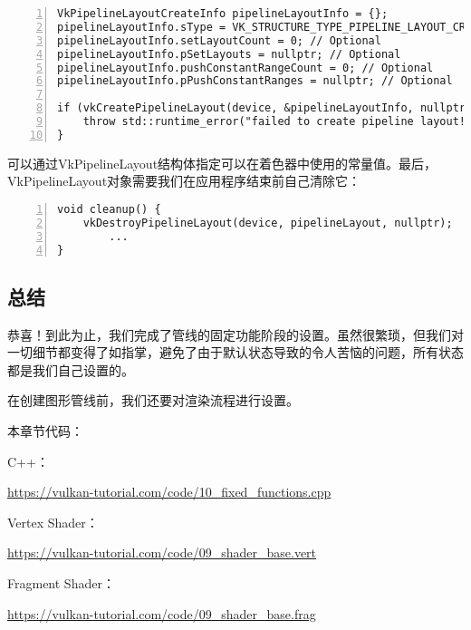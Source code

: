 \documentclass{ctexart}
\begin{document}
\begin{lstlisting}[language={[ANSI]C},keywordstyle=\color{blue!70},commentstyle=\color{red!50!green!50!blue!50},frame=shadowbox, rulesepcolor=\color{red!20!green!20!blue!20},basicstyle=\small,numbers=left, numberstyle=\tiny,breaklines=true]
VkPipelineLayoutCreateInfo pipelineLayoutInfo = {};
pipelineLayoutInfo.sType = VK_STRUCTURE_TYPE_PIPELINE_LAYOUT_CREATE_INFO;
pipelineLayoutInfo.setLayoutCount = 0; // Optional
pipelineLayoutInfo.pSetLayouts = nullptr; // Optional
pipelineLayoutInfo.pushConstantRangeCount = 0; // Optional
pipelineLayoutInfo.pPushConstantRanges = nullptr; // Optional

if (vkCreatePipelineLayout(device, &pipelineLayoutInfo, nullptr, &pipelineLayout) != VK_SUCCESS) {
	throw std::runtime_error("failed to create pipeline layout!");
}
\end{lstlisting}

可以通过VkPipelineLayout结构体指定可以在着色器中使用的常量值。最后，VkPipelineLayout对象需要我们在应用程序结束前自己清除它：

\begin{lstlisting}[language={[ANSI]C},keywordstyle=\color{blue!70},commentstyle=\color{red!50!green!50!blue!50},frame=shadowbox, rulesepcolor=\color{red!20!green!20!blue!20},basicstyle=\small,numbers=left, numberstyle=\tiny,breaklines=true]
void cleanup() {
	vkDestroyPipelineLayout(device, pipelineLayout, nullptr);
		...
}
\end{lstlisting}

\subsection{总结}

恭喜！到此为止，我们完成了管线的固定功能阶段的设置。虽然很繁琐，但我们对一切细节都变得了如指掌，避免了由于默认状态导致的令人苦恼的问题，所有状态都是我们自己设置的。

在创建图形管线前，我们还要对渲染流程进行设置。

本章节代码：

C++：

\url{https://vulkan-tutorial.com/code/10_fixed_functions.cpp}

Vertex Shader：

\url{https://vulkan-tutorial.com/code/09_shader_base.vert}

Fragment Shader：

\url{https://vulkan-tutorial.com/code/09_shader_base.frag}

\newpage
\end{document}
